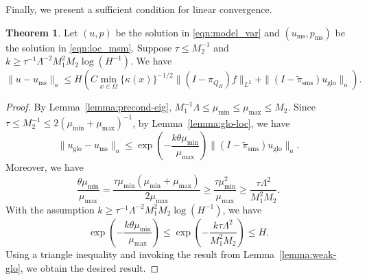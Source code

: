 \documentclass{article}[11pt]
\theoremstyle{definition}
\newtheorem{theorem}{Theorem}[section]
\begin{document}
Finally, we present a sufficient condition for linear convergence. 
\begin{theorem} \label{thm:main}
Let $(u,p)$ be the solution in \eqref{eqn:model_var} and 
$(u_{\text{ms}},p_{\text{ms}})$ be the solution in \eqref{eqn:loc_msm}. 
Suppose $\tau \leq M_2^{-1}$ 
and $k \geq \tau^{-1} \Lambda^{-2} M_1^2 M_2 \log(H^{-1})$.  
We have
\begin{equation}
\| u - u_{\text{ms}} \|_a \leq H\left(
C\min_{x\in\Omega}\{\kappa(x)\}^{-1/2}\|(I - \pi_{Q_H}) f\|_{L^{2}} + \| (I - \tilde{\pi}_{\text{sms}}) u_{\text{glo}} \|_a\right).
\end{equation}
\begin{proof}
By Lemma~\ref{lemma:precond-eig}, 
$M_1^{-1} \Lambda \leq \mu_{\text{min}} \leq \mu_{\text{max}} \leq M_2$. 
Since $\tau \leq M_2^{-1} \leq 2(\mu_{\text{min}}+\mu_{\text{max}})^{-1}$, by Lemma~\ref{lemma:glo-loc}, we have 
\[
\| u_{\text{glo}} - u_{\text{ms}} \|_a \leq  \exp\left(- \dfrac{k \theta \mu_{\text{min}}}{\mu_{\text{max}}}\right) \| (I - \tilde{\pi}_{\text{sms}}) u_{\text{glo}} \|_a.
\]
Moreover, we have 
\[ 
\dfrac{\theta \mu_{\text{min}}}{\mu_{\text{max}}} 
= \dfrac{\tau \mu_{\text{min}}(\mu_{\text{min}} + \mu_{\text{max}})}{2\mu_{\text{max}}} 
\geq \dfrac{\tau \mu_{\text{min}}^2}{\mu_{\text{max}}} 
\geq \dfrac{\tau \Lambda^2}{M_1^2 M_2}.
\]
With the assumption  $k \geq \tau^{-1} \Lambda^{-2} M_1^2 M_2 \log(H^{-1})$, we have 
\[ 
\exp\left(- \dfrac{k \theta \mu_{\text{min}}}{\mu_{\text{max}}}\right) 
\leq \exp\left(- \dfrac{k \tau \Lambda^2}{M_1^2 M_2}\right) \leq H. 
\]
Using a triangle inequality and invoking the result from Lemma~\ref{lemma:weak-glo}, we obtain the desired result. 
\end{proof}
\end{theorem}
\end{document}

